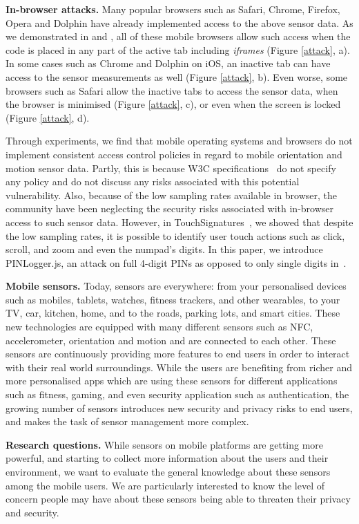 \documentclass[10pt,twocolumn]{article}
\begin{document}
\textbf{In-browser attacks.} Many popular browsers such as Safari, Chrome, Firefox, Opera and Dolphin have already implemented access to the above sensor data. As we demonstrated in \cite{TouchSig} and \cite{Mehrnezhad}, all of these mobile browsers allow such access when the code is placed in any part of the active tab including \textit{iframes} (Figure \ref{attack}, a). In some cases such as Chrome and Dolphin on iOS, an inactive tab can have access to the sensor measurements as well (Figure \ref{attack}, b). Even worse, some browsers such as Safari allow the inactive tabs to access the sensor data, when the browser is minimised (Figure \ref{attack}, c), or even when the screen is locked (Figure \ref{attack}, d). 

Through experiments, we find that mobile operating systems and browsers do not implement consistent access control policies in regard to mobile orientation and motion sensor data. Partly, this is because W3C specifications~\cite{W3CMotion} do not specify any policy and do not discuss any risks associated with this potential vulnerability. Also, because of the low sampling rates available in browser, the community have been neglecting the security risks associated with in-browser access to such sensor data. However, in TouchSignatures~\cite{Mehrnezhad}, we showed that despite the low sampling rates, it is possible to identify user touch actions such as click, scroll, and zoom and even the numpad's digits. In this paper, we introduce PINLogger.js, an attack on full 4-digit PINs as opposed to only single digits in~\cite{Mehrnezhad}.

\textbf{Mobile sensors.}
Today, sensors are everywhere: from your personalised devices such as mobiles, tablets, watches, fitness trackers, and other wearables, to your TV, car, kitchen, home, and to the roads, parking lots, and smart cities. These new technologies are equipped with many different sensors such as NFC, accelerometer, orientation and motion and are connected to each other. 
These sensors are continuously providing
more features to end users in order to interact with their real world
surroundings. While the users are benefiting from richer and more personalised apps which are using these sensors for different applications such as fitness, gaming, and even security application such as authentication, 
the growing number of sensors introduces new security and privacy risks to end users, and makes the task of sensor management more complex. 


\textbf{Research questions.} While sensors on mobile platforms are getting more powerful, and starting to collect more information about the users and their environment, we want to evaluate the general knowledge about these sensors among the mobile users. We are particularly interested to know the level of concern people may have about these sensors being able to threaten their privacy and security.  
\end{document}
